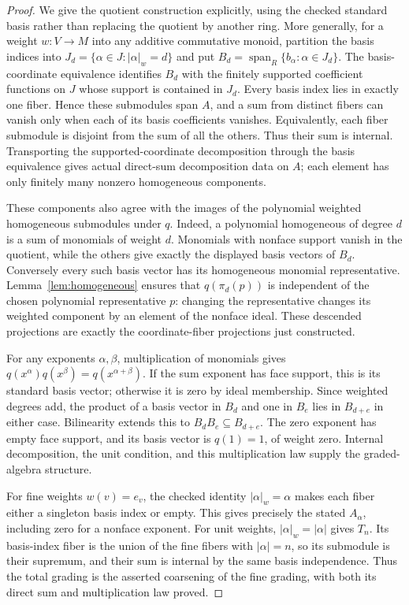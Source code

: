 \begin{proof}
\leanok
We give the quotient construction explicitly, using the checked standard
basis rather than replacing the quotient by another ring. More generally,
for a weight $w:V\to M$ into any additive commutative monoid, partition the
basis indices into $J_d=\{\alpha\in J:|\alpha|_w=d\}$ and put
$B_d=\operatorname{span}_R\{b_\alpha:\alpha\in J_d\}$.
The basis-coordinate equivalence identifies $B_d$ with the finitely
supported coefficient functions on $J$ whose support is contained in
$J_d$. Every basis index lies in exactly one fiber. Hence these submodules
span $A$, and a sum from distinct fibers can vanish only when each of its
basis coefficients vanishes. Equivalently, each fiber submodule is disjoint
from the sum of all the others. Thus their sum is internal. Transporting
the supported-coordinate decomposition through the basis equivalence gives
actual direct-sum decomposition data on $A$; each element has only finitely
many nonzero homogeneous components.

These components also agree with the images of the polynomial weighted
homogeneous submodules under $q$. Indeed, a polynomial homogeneous of degree
$d$ is a sum of monomials of weight $d$. Monomials with nonface support
vanish in the quotient, while the others give exactly the displayed basis
vectors of $B_d$. Conversely every such basis vector has its homogeneous
monomial representative. Lemma~\ref{lem:homogeneous} ensures that
$q(\pi_d(p))$ is independent of the chosen polynomial representative $p$:
changing the representative changes its weighted component by an element
of the nonface ideal. These descended projections are exactly the
coordinate-fiber projections just constructed.

For any exponents $\alpha,\beta$, multiplication of monomials gives
$q(x^\alpha)q(x^\beta)=q(x^{\alpha+\beta})$. If the sum exponent has face
support, this is its standard basis vector; otherwise it is zero by ideal
membership. Since weighted degrees add, the product of a basis vector in
$B_d$ and one in $B_e$ lies in $B_{d+e}$ in either case. Bilinearity extends
this to $B_dB_e\subseteq B_{d+e}$. The zero exponent has empty face support,
and its basis vector is $q(1)=1$, of weight zero. Internal decomposition,
the unit condition, and this multiplication law supply the graded-algebra
structure.

For fine weights $w(v)=e_v$, the checked identity
$|\alpha|_w=\alpha$ makes each fiber either a singleton basis index or
empty. This gives precisely the stated $A_\alpha$, including zero for a
nonface exponent. For unit weights, $|\alpha|_w=|\alpha|$ gives $T_n$.
Its basis-index fiber is the union of the fine fibers with
$|\alpha|=n$, so its submodule is their supremum, and their sum is internal
by the same basis independence. Thus the total grading is the asserted
coarsening of the fine grading, with both its direct sum and multiplication
law proved.


\end{proof}
